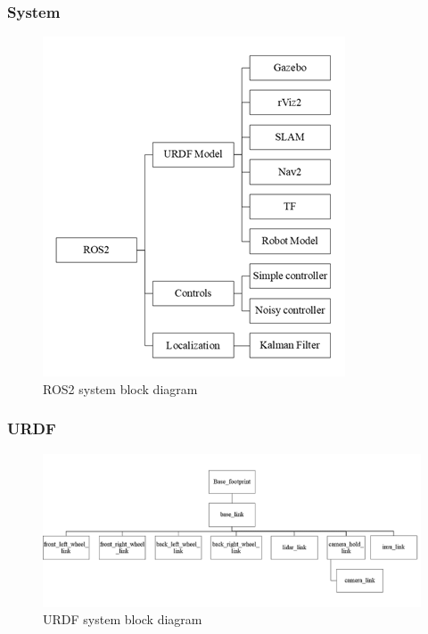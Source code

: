 \subsubsection{System}
	\begin{figure}[H]
		\centering
		\includegraphics{images/Content/system_block_dia.png}
		\caption{ROS2 system block diagram}
		\label{fig:fig2}
	\end{figure}

\subsubsection{URDF}
	\begin{figure}[H]
		\centering
		\includegraphics[scale=0.9]{images/Content/URDF_block_dia.png}
		\caption{URDF system block diagram}
		\label{fig:fig3}
	\end{figure}


